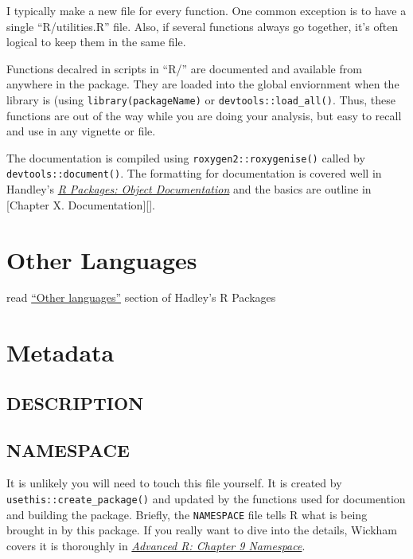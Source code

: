\documentclass[]{book}
\begin{document}
I typically make a new file for every function. One common exception is to have a single ``R/utilities.R'' file. Also, if several functions always go together, it's often logical to keep them in the same file.

Functions decalred in scripts in ``R/'' are documented and available from anywhere in the package. They are loaded into the global enviornment when the library is (using \texttt{library(packageName)} or \texttt{devtools::load\_all()}. Thus, these functions are out of the way while you are doing your analysis, but easy to recall and use in any vignette or file.

The documentation is compiled using \texttt{roxygen2::roxygenise()} called by \texttt{devtools::document()}. The formatting for documentation is covered well in Handley's \href{https://r-pkgs.org/man.html}{\emph{R Packages: Object Documentation}} and the basics are outline in {[}Chapter X. Documentation{]}{[}{]}.

\hypertarget{other-languages}{%
\section{Other Languages}\label{other-languages}}

read \href{https://r-pkgs.org/inst.html\#inst-other-langs}{``Other languages''} section of Hadley's R Packages

\hypertarget{metadata}{%
\section{Metadata}\label{metadata}}

\hypertarget{description}{%
\subsection{DESCRIPTION}\label{description}}

\hypertarget{namespace}{%
\subsection{NAMESPACE}\label{namespace}}

It is unlikely you will need to touch this file yourself. It is created by \texttt{usethis::create\_package()} and updated by the functions used for documention and building the package. Briefly, the \texttt{NAMESPACE} file tells R what is being brought in by this package. If you really want to dive into the details, Wickham covers it is thoroughly in \href{https://r-pkgs.org/namespace.html}{\emph{Advanced R: Chapter 9 Namespace}}.
\end{document}

